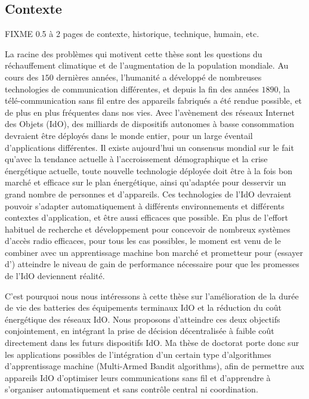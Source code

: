 \begin{resume_fr}
\section*{Contexte}

FIXME 0.5 à 2 pages de contexte, historique, technique, humain, etc.

%
La racine des problèmes qui motivent cette thèse sont les questions du réchauffement climatique et de l'augmentation de la population mondiale.
Au cours des $150$ dernières années, l'humanité a développé de nombreuses technologies de communication différentes, et depuis la fin des années $1890$, la télé-communication sans fil entre des appareils fabriqués a été rendue possible, et de plus en plus fréquentes dans nos vies.
Avec l'avènement des réseaux Internet des Objets (IdO), des milliards de dispositifs autonomes à basse consommation devraient être déployés dans le monde entier, pour un large éventail d'applications différentes.
Il existe aujourd'hui un consensus mondial sur le fait qu'avec la tendance actuelle à l'accroissement démographique et la crise énergétique actuelle, toute nouvelle technologie déployée doit être à la fois bon marché et efficace sur le plan énergétique,
ainsi qu'adaptée pour desservir un grand nombre de personnes et d'appareils.
%
Ces technologies de l'IdO devraient pouvoir s'adapter automatiquement à différents environnements et différents contextes d'application, et être aussi efficaces que possible.
%
En plus de l'effort habituel de recherche et développement pour concevoir de nombreux systèmes d'accès radio efficaces, pour tous les cas possibles,
le moment est venu de le combiner avec un apprentissage machine bon marché et prometteur pour (essayer d') atteindre le niveau de gain de performance nécessaire pour que les promesses de l'IdO deviennent réalité.


C'est pourquoi nous nous intéressons à cette thèse sur
l'amélioration de la durée de vie des batteries des équipements terminaux IdO et la réduction du coût énergétique des réseaux IdO.
Nous proposons d'atteindre ces deux objectifs conjointement, en intégrant la prise de décision décentralisée à faible coût directement dans les futurs dispositifs IdO.
%
Ma thèse de doctorat porte donc sur les applications possibles de l'intégration d'un certain type d'algorithmes d'apprentissage machine (Multi-Armed Bandit algorithms), afin de permettre aux appareils IdO d'optimiser leurs communications sans fil et d'apprendre à s'organiser automatiquement et sans contrôle central ni coordination.



\end{resume_fr}
